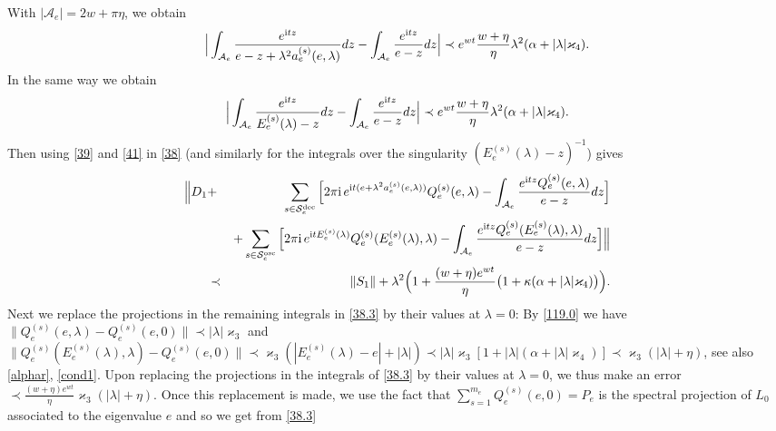 \documentclass[letterpaper,onecolumn,11pt,accepted=2021-12-09]{quantumarticle}
\numberwithin{equation}{section}
\newcommand{\aes}{a_e^{(s)}}
\newcommand{\Qes}{Q_e^{(s)}}
\newcommand{\Ees}{E_e^{(s)}(\lambda)}
\renewcommand{\i}{{\rm i}}
\begin{document}
With $|{\mathcal A}_e| = 2w +\pi\eta$, we obtain
\begin{equation}
	\label{41}
 \Big| \int_{{\mathcal A}_e}  \frac{e^{\i t z}  }{e-z+\lambda^2 
 	\aes(e,\lambda)}dz -  \int_{{\mathcal A}_e} \frac{e^{\i t z}  }{e-z} dz \Big| \prec e^{wt}\frac{w +\eta}{\eta} \lambda^2(\alpha+|\lambda|\varkappa_4).
\end{equation}
In the same way we obtain
\begin{equation}
	\label{41.2}
	\Big| \int_{{\mathcal A}_e}  \frac{e^{\i t z}  }{\Ees -z}dz -  \int_{{\mathcal A}_e} \frac{e^{\i t z}  }{e-z} dz \Big| \prec e^{wt}\frac{w +\eta}{\eta} \lambda^2(\alpha+|\lambda|\varkappa_4).
\end{equation}
Then using \eqref{39}  and \eqref{41} in  \eqref{38} (and similarly for the integrals over the singularity $(\Ees-z)^{-1}$)  gives
\begin{eqnarray}
	\Big\| D_1 &+&\sum_{s\in{\mathcal S}_e^{\rm dec}} \Big[ 2\pi\i  \, e^{\i t(e+\lambda^2\aes(e,\lambda))} \Qes(e,\lambda) -\int_{{\mathcal A}_e} \frac{e^{\i t z}\Qes(e,\lambda)}{e-z}dz \Big]\nonumber\\
&&+\sum_{s\in{\mathcal S}_e^{\rm osc}} \Big[ 2\pi\i \, e^{\i t \Ees}\Qes(\Ees,\lambda) -\int_{{\mathcal A}_e} \frac{e^{\i t z}\Qes(\Ees,\lambda)}{e-z}dz\Big] \Big\| \nonumber\\
	&\prec& \|S_1\| + \lambda^2\Big(1 + \frac{(w+\eta) e^{wt}}{\eta}\big(1+\kappa(\alpha+|\lambda|\varkappa_4)\big)\Big) .
	\label{38.3}
\end{eqnarray}
Next we replace the projections in the remaining integrals in \eqref{38.3} by their values at $\lambda=0$: By \eqref{119.0} we have  $\|\Qes(e,\lambda)-\Qes(e,0)\|\prec |\lambda|\varkappa_3$ and $\| \Qes(\Ees,\lambda)-\Qes(e,0)\|\prec \varkappa_3 (|\Ees-e|+|\lambda|)\prec  |\lambda|\varkappa_3  [1+|\lambda|(\alpha+|\lambda| \varkappa_4)] \prec \varkappa_3(|\lambda|+\eta)$, see also \eqref{alphar}, \eqref{cond1}. Upon replacing the projections in the integrals of \eqref{38.3} by their values at $\lambda=0$, we thus make an error $\prec   \frac{(w+\eta)e^{wt}}{\eta} \varkappa_3 (|\lambda|+\eta)$. Once this replacement is made, we  use the fact that $\sum_{s=1}^{m_e} \Qes(e,0) = P_e$ is the spectral projection of $L_0$ associated to the eigenvalue $e$ and so we get from \eqref{38.3}
\end{document}
